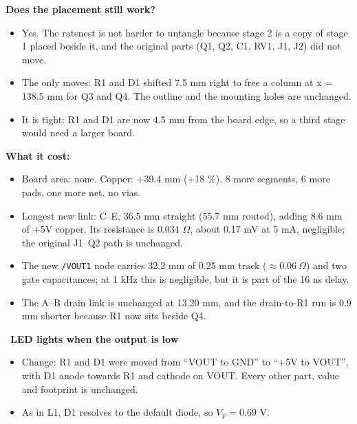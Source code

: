 \documentclass[11pt,a4paper]{article}
\newcommand{\lab}[2]{\Needspace{5\baselineskip}\vspace{6pt}{\sffamily\bfseries\color{teal}\large #1}\ {\sffamily\bfseries\color{ink}#2}\par\vspace{-2pt}{\color{amber}\rule{2.2em}{1.4pt}}\par\vspace{2pt}}
\begin{document}
\begin{answer}
\textbf{Does the placement still work?}
\begin{itemize}
\item Yes. The ratsnest is not harder to untangle because stage 2 is a copy of stage 1 placed beside it, and the original parts (Q1, Q2, C1, RV1, J1, J2) did not move.
\item The only moves: R1 and D1 shifted 7.5 mm right to free a column at x = 138.5 mm for Q3 and Q4. The outline and the mounting holes are unchanged.
\item It is tight: R1 and D1 are now 4.5 mm from the board edge, so a third stage would need a larger board.
\end{itemize}
\textbf{What it cost:}
\begin{itemize}
\item Board area: none. Copper: +39.4 mm (+18 \%), 8 more segments, 6 more pads, one more net, no vias.
\item Longest new link: C--E, 36.5 mm straight (55.7 mm routed), adding 8.6 mm of +5V copper. Its resistance is 0.034 $\Omega$, about 0.17 mV at 5 mA, negligible; the original J1--Q2 path is unchanged.
\item The new \texttt{/VOUT1} node carries 32.2 mm of 0.25 mm track ($\approx0.06\ \Omega$) and two gate capacitances; at 1 kHz this is negligible, but it is part of the 16 ns delay.
\item The A--B drain link is unchanged at 13.20 mm, and the drain-to-R1 run is 0.9 mm shorter because R1 now sits beside Q4.
\end{itemize}
\end{answer}

\lab{Option 2}{LED lights when the output is low}
\begin{itemize}
\item Change: R1 and D1 were moved from ``VOUT to GND'' to ``+5V to VOUT'', with D1 anode towards R1 and cathode on VOUT. Every other part, value and footprint is unchanged.
\item As in L1, D1 resolves to the default diode, so $V_F=0.69$ V.
\end{itemize}
\end{document}
